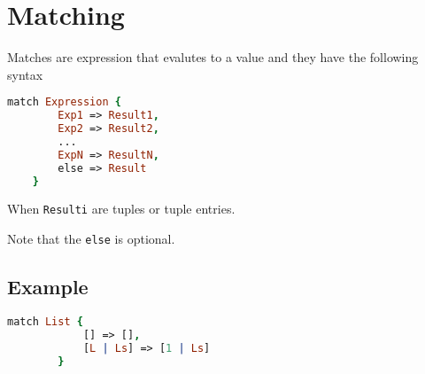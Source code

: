 \section{Matching}

Matches are expression that evalutes to a value and they have the
following syntax

\begin{lstlisting}[language = Prolog]
    match Expression {
        Exp1 => Result1,
        Exp2 => Result2,
        ...
        ExpN => ResultN,
        else => Result
    }
\end{lstlisting}

When \texttt{Resulti} are tuples or tuple entries.

Note that the \texttt{else} is optional.

\subsection{Example}

\begin{lstlisting}[language =Prolog]
        match List {
            [] => [],
            [L | Ls] => [1 | Ls]
        }
    \end{lstlisting}

